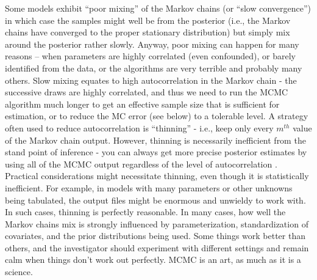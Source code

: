 Some models exhibit ``poor mixing'' of the Markov chains (or ``slow convergence'')
in which case the samples might well
be from the posterior (i.e., the Markov chains have converged to the
proper stationary distribution) but simply mix around the posterior
rather slowly. Anyway, poor mixing can happen for many
reasons -- when parameters are highly correlated (even confounded), or
barely identified from the data, or the algorithms are very terrible
and probably many others.  Slow mixing equates to high
autocorrelation in the Markov chain - the successive draws are highly
correlated, and thus we need to run the MCMC algorithm much longer to
get an effective sample size that is sufficient for estimation, or to
reduce the MC error (see below) to a tolerable level.  A strategy often used to
reduce autocorrelation is ``thinning'' - i.e., keep only every $m^{th}$
value of the Markov chain output. However, thinning is necessarily
inefficient from the stand point of inference - you can always get
more precise posterior estimates by using all of the MCMC output
regardless of the level of autocorrelation
\citep{maceachern_berliner:1994, link_eaton:2011}. Practical considerations might
necessitate thinning, even though it is statistically inefficient. For
example, in models with many parameters or other unknowns being
tabulated, the output files might be enormous and unwieldy to work
with. In such cases, thinning is perfectly reasonable. In many cases,
how well the Markov chains mix is strongly influenced by
parameterization, standardization of covariates, and the prior
distributions being used. Some things work better than others, and the
investigator should experiment with different settings and
remain calm when things don't work out perfectly. MCMC is an
art, as much as it is a science.


